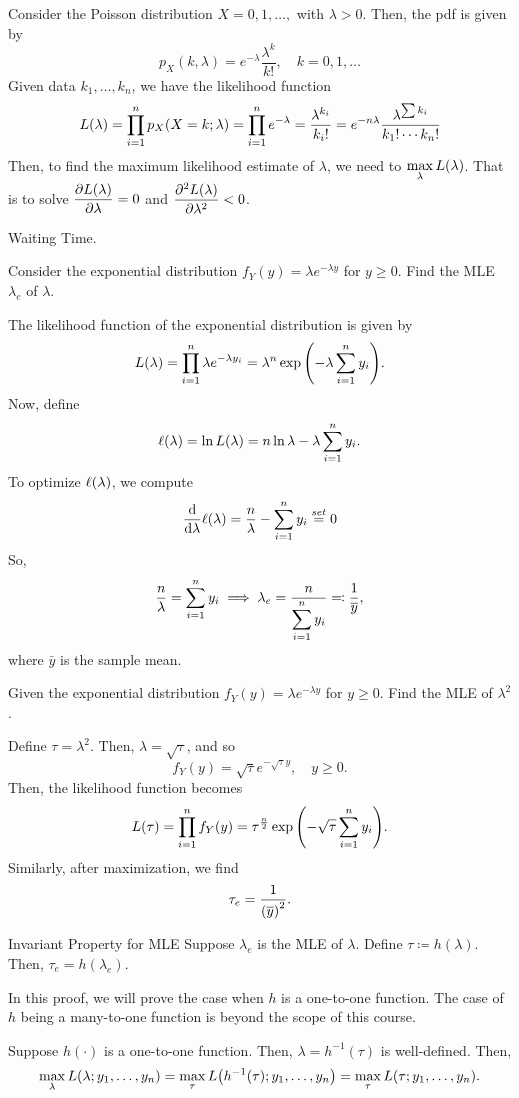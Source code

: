 \begin{eg}
	Consider the Poisson distribution $X=0,1,\dots,$ with $\lambda>0$. Then, the pdf is given by \[p_X(k,\lambda)=e^{-\lambda}\dfrac{\lambda^k}{k!},\quad k=0,1,\dots\] Given data $k_1,\dots,k_n$, we have the likelihood function \[L(\lambda)=\prod_{i=1}^np_X\qty(X=k;\lambda)=\prod_{i=1}^ne^{-\lambda}=\dfrac{\lambda^{k_i}}{k_i!}=e^{-n\lambda}\dfrac{\lambda^{\sum{k_i}}}{k_1!\cdots k_n!}\] Then, to find the maximum likelihood estimate of $\lambda$, we need to $\displaystyle\max_{\lambda}L(\lambda)$. That is to solve $\displaystyle\pdv{L(\lambda)}{\lambda}=0$ and $\displaystyle\pdv[2]{L(\lambda)}{\lambda}<0$.
\end{eg}
\begin{eg}
	Waiting Time. \par 
	Consider the exponential distribution $f_Y(y)=\lambda e^{-\lambda y}$ for $y\geq 0$. Find the MLE $\lambda_e$ of $\lambda$.
	\begin{sol}
		The likelihood function of the exponential distribution is given by
		\[L(\lambda)=\prod_{i=1}^n\lambda e^{-\lambda y_i}=\lambda^n\exp\qty(-\lambda\sum_{i=1}^ny_i).\] Now, define \[\ell(\lambda)=\ln L(\lambda)=n\ln\lambda-\lambda\sum_{i=1}^ny_i.\] To optimize $\ell(\lambda)$, we compute \[\dv{\lambda}\ell(\lambda)=\dfrac{n}{\lambda}-\sum_{i=1}^ny_i\stackrel{set}{=}0\] So, \[\dfrac{n}{\lambda}=\sum_{i=1}^ny_i\implies\lambda_e=\dfrac{n}{\displaystyle\sum_{i=1}^ny_i}\eqqcolon\dfrac{1}{\overline{y}},\] where $\bar{y}$ is the sample mean. 
	\end{sol}
\end{eg}
\begin{eg}
	Given the exponential distribution $f_Y(y)=\lambda e^{-\lambda y}$ for $y\geq0$. Find the MLE of $\lambda^2$.
	\begin{sol}
		Define $\tau=\lambda^2$. Then, $\lambda=\sqrt{\tau}$, and so \[f_Y(y)=\sqrt{\tau}e^{-\sqrt{\tau}y},\quad y\geq0.\] Then, the likelihood function becomes \[L(\tau)=\prod_{i=1}^nf_Y(y)=\tau^{\frac{n}{2}}\exp\qty(-\sqrt{\tau}\sum_{i=1}^ny_i).\] Similarly, after maximization, we find \[\tau_e=\dfrac{1}{\qty(\overline{y})^2}.\]
	\end{sol}
\end{eg}
\begin{thm}{Invariant Property for MLE}
	Suppose $\lambda_e$	is the MLE of $\lambda$. Define $\tau\coloneqq h(\lambda)$. Then, $\tau_e=h(\lambda_e)$.
\end{thm}
\begin{prf}
	In this proof, we will prove the case when $h$ is a one-to-one function. The case of $h$ being a many-to-one function is beyond the scope of this course. \par 
	Suppose $h(\cdot)$ is a one-to-one function. Then, $\lambda=h^{-1}(\tau)$ is well-defined. Then, \[\max_{\lambda}L(\lambda;y_1,\dots,y_n)=\max_{\tau}L\qty(h^{-1}(\tau);y_1,\dots,y_n)=\max_{\tau}L(\tau;y_1,\dots,y_n).\]	
\end{prf}
